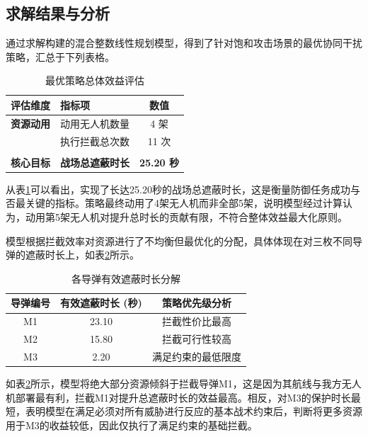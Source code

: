 \documentclass[5pt, withoutpreface,bwprint]{cumcmthesis} %
\begin{document}
\subsection{求解结果与分析}
通过求解构建的混合整数线性规划模型，得到了针对饱和攻击场景的最优协同干扰策略，汇总于下列表格。



\begin{table}[htbp]
    \centering
    \large
    \caption{最优策略总体效益评估}
    \label{tab:p5_overall_results}
    \begin{tabular}{@{}llc@{}}
        \toprule
        \textbf{评估维度} & \textbf{指标项} & \textbf{数值} \\
        \midrule
        \textbf{资源动用} & 动用无人机数量 & 4 架 \\
        & 执行拦截总次数 & 11 次 \\
        \\
        \textbf{核心目标} & \bfseries 战场总遮蔽时长 & \bfseries 25.20 秒 
       \\
        \bottomrule
    \end{tabular}
\end{table}

从表\ref{tab:p5_overall_results}可以看出，实现了长达25.20秒的战场总遮蔽时长，这是衡量防御任务成功与否最关键的指标。策略最终动用了4架无人机而非全部5架，说明模型经过计算认为，动用第5架无人机对提升总时长的贡献有限，不符合整体效益最大化原则。


模型根据拦截效率对资源进行了不均衡但最优化的分配，具体体现在对三枚不同导弹的遮蔽时长上，如表\ref{tab:p5_missile_coverage}所示。

\begin{table}[H]
    \centering
    \caption{各导弹有效遮蔽时长分解}
    \label{tab:p5_missile_coverage}
    \begin{tabular}{@{}ccc@{}}
        \toprule
        \textbf{导弹编号} & \textbf{有效遮蔽时长 (秒)} & \textbf{策略优先级分析} \\
        \midrule
         M1 &  23.10 &拦截性价比最高 \\
        M2 & 15.80 & 拦截可行性较高 \\
        M3 & 2.20 & 满足约束的最低限度\\
        \bottomrule
    \end{tabular}
\end{table}

如表\ref{tab:p5_missile_coverage}所示，模型将绝大部分资源倾斜于拦截导弹M1，这是因为其航线与我方无人机部署最有利，拦截M1对提升总遮蔽时长的效益最高。相反，对M3的保护时长最短，表明模型在满足必须对所有威胁进行反应的基本战术约束后，判断将更多资源用于M3的收益较低，因此仅执行了满足约束的基础拦截。
\end{document}
